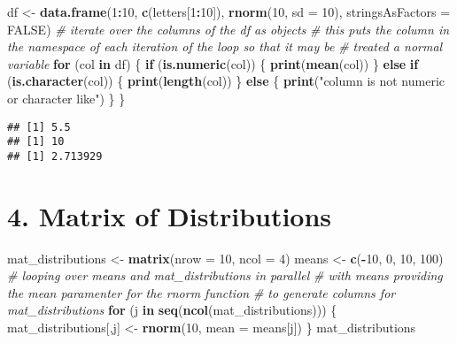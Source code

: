 \documentclass[]{article}
\newenvironment{Shaded}{\begin{snugshade}}{\end{snugshade}}
\newcommand{\CommentTok}[1]{\textcolor[rgb]{0.56,0.35,0.01}{\textit{#1}}}
\newcommand{\ControlFlowTok}[1]{\textcolor[rgb]{0.13,0.29,0.53}{\textbf{#1}}}
\newcommand{\DataTypeTok}[1]{\textcolor[rgb]{0.13,0.29,0.53}{#1}}
\newcommand{\DecValTok}[1]{\textcolor[rgb]{0.00,0.00,0.81}{#1}}
\newcommand{\KeywordTok}[1]{\textcolor[rgb]{0.13,0.29,0.53}{\textbf{#1}}}
\newcommand{\NormalTok}[1]{#1}
\newcommand{\OperatorTok}[1]{\textcolor[rgb]{0.81,0.36,0.00}{\textbf{#1}}}
\newcommand{\OtherTok}[1]{\textcolor[rgb]{0.56,0.35,0.01}{#1}}
\newcommand{\StringTok}[1]{\textcolor[rgb]{0.31,0.60,0.02}{#1}}
\begin{document}
\begin{Shaded}
\begin{Highlighting}[]
\NormalTok{df <-}\StringTok{ }\KeywordTok{data.frame}\NormalTok{(}\DecValTok{1}\OperatorTok{:}\DecValTok{10}\NormalTok{, }\KeywordTok{c}\NormalTok{(letters[}\DecValTok{1}\OperatorTok{:}\DecValTok{10}\NormalTok{]), }\KeywordTok{rnorm}\NormalTok{(}\DecValTok{10}\NormalTok{, }\DataTypeTok{sd =} \DecValTok{10}\NormalTok{), }\DataTypeTok{stringsAsFactors =} \OtherTok{FALSE}\NormalTok{)}
\CommentTok{# iterate over the columns of the df as objects}
\CommentTok{# this puts the column in the namespace of each iteration of the loop so that it may be}
\CommentTok{# treated a normal variable }
\ControlFlowTok{for}\NormalTok{ (col }\ControlFlowTok{in}\NormalTok{ df) \{}
  \ControlFlowTok{if}\NormalTok{ (}\KeywordTok{is.numeric}\NormalTok{(col)) \{}
    \KeywordTok{print}\NormalTok{(}\KeywordTok{mean}\NormalTok{(col))}
\NormalTok{  \} }\ControlFlowTok{else} \ControlFlowTok{if}\NormalTok{ (}\KeywordTok{is.character}\NormalTok{(col)) \{}
    \KeywordTok{print}\NormalTok{(}\KeywordTok{length}\NormalTok{(col))}
\NormalTok{  \} }\ControlFlowTok{else}\NormalTok{ \{}
    \KeywordTok{print}\NormalTok{(}\StringTok{"column is not numeric or character like"}\NormalTok{)}
\NormalTok{  \}}
\NormalTok{\}}
\end{Highlighting}
\end{Shaded}

\begin{verbatim}
## [1] 5.5
## [1] 10
## [1] 2.713929
\end{verbatim}

\hypertarget{matrix-of-distributions}{%
\section{4. Matrix of Distributions}\label{matrix-of-distributions}}

\begin{Shaded}
\begin{Highlighting}[]
\NormalTok{mat_distributions <-}\StringTok{ }\KeywordTok{matrix}\NormalTok{(}\DataTypeTok{nrow =} \DecValTok{10}\NormalTok{, }\DataTypeTok{ncol =} \DecValTok{4}\NormalTok{)}
\NormalTok{means <-}\StringTok{ }\KeywordTok{c}\NormalTok{(}\OperatorTok{-}\DecValTok{10}\NormalTok{, }\DecValTok{0}\NormalTok{, }\DecValTok{10}\NormalTok{, }\DecValTok{100}\NormalTok{)}
\CommentTok{# looping over means and mat_distributions in parallel }
\CommentTok{# with means providing the mean paramenter for the rnorm function}
\CommentTok{# to generate columns for mat_distributions}
\ControlFlowTok{for}\NormalTok{ (j }\ControlFlowTok{in} \KeywordTok{seq}\NormalTok{(}\KeywordTok{ncol}\NormalTok{(mat_distributions))) \{}
\NormalTok{  mat_distributions[,j] <-}\StringTok{ }\KeywordTok{rnorm}\NormalTok{(}\DecValTok{10}\NormalTok{, }\DataTypeTok{mean =}\NormalTok{ means[j])}
\NormalTok{\}}
\NormalTok{mat_distributions}
\end{Highlighting}
\end{Shaded}
\end{document}
